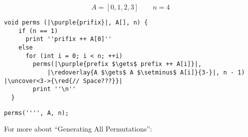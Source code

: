 \begin{frame}{}
  \[
    A = [0,1,2,3] \qquad n = 4
  \]
\end{frame}

\begin{frame}[fragile]{}
  \begin{lstlisting}[style = Cstyle]
  void perms (|\purple{prifix}|, A[], n) {
    if (n == 1)
      print ''prifix ++ A[0]''
    else 
      for (int i = 0; i < n; ++i)
        perms(|\purple{prefix $\gets$ prefix ++ A[i]}|, 
            |\redoverlay{A $\gets$ A $\setminus$ A[i]}{3-}|, n - 1) |\uncover<3->{\red{// Space???}}|
        print ''\n''
  }
  \end{lstlisting}

  \pause
  \begin{lstlisting}[style = Cstyle]
  perms('''', A, n);
  \end{lstlisting}
\end{frame}

\begin{frame}{}
  \centerline{\Large For more about ``Generating All Permutations'':}

  \vspace{0.30cm}
  \begin{columns}
  \end{columns}
\end{frame}


